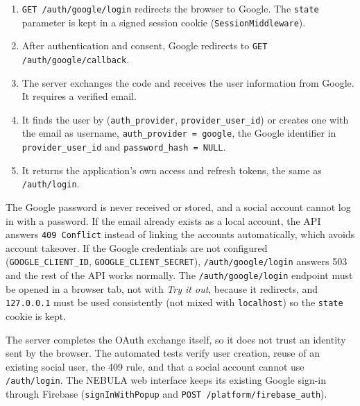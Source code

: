 \documentclass[9pt,a4paper,twocolumn]{article}
\begin{document}
\begin{enumerate}
    \item \texttt{GET /auth/google/login} redirects the browser to Google. The \texttt{state} parameter is kept in a signed session cookie (\texttt{SessionMiddleware}).
    \item After authentication and consent, Google redirects to \texttt{GET /auth/google/callback}.
    \item The server exchanges the code and receives the user information from Google. It requires a verified email.
    \item It finds the user by (\texttt{auth\_provider}, \texttt{provider\_user\_id}) or creates one with the email as username, \texttt{auth\_provider = google}, the Google identifier in \texttt{provider\_user\_id} and \texttt{password\_hash = NULL}.
    \item It returns the application's own access and refresh tokens, the same as \texttt{/auth/login}.
\end{enumerate}

The Google password is never received or stored, and a social account cannot log in with a password. If the email already exists as a local account, the API answers \texttt{409 Conflict} instead of linking the accounts automatically, which avoids account takeover. If the Google credentials are not configured (\texttt{GOOGLE\_CLIENT\_ID}, \texttt{GOOGLE\_CLIENT\_SECRET}), \texttt{/auth/google/login} answers 503 and the rest of the API works normally. The \texttt{/auth/google/login} endpoint must be opened in a browser tab, not with \textit{Try it out}, because it redirects, and \texttt{127.0.0.1} must be used consistently (not mixed with \texttt{localhost}) so the \texttt{state} cookie is kept.

The server completes the OAuth exchange itself, so it does not trust an identity sent by the browser. The automated tests verify user creation, reuse of an existing social user, the 409 rule, and that a social account cannot use \texttt{/auth/login}. The NEBULA web interface keeps its existing Google sign-in through Firebase (\texttt{signInWithPopup} and \texttt{POST /platform/firebase\_auth}).
\end{document}
